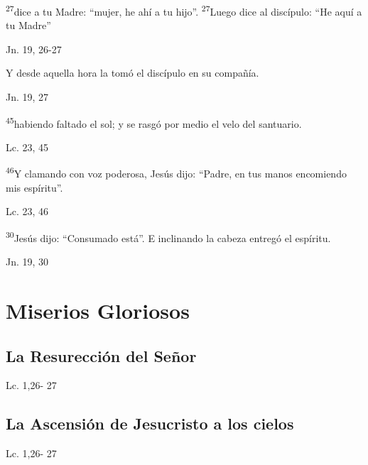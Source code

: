 \documentclass[a4paper,11pt]{article}
\begin{document}
      \textsuperscript{27}dice a tu Madre: ``mujer, he ahí a tu hijo''. \textsuperscript{27}Luego dice al discípulo: ``He aquí a tu Madre''
      \begin{flushright}
        Jn. 19, 26-27
      \end{flushright}

      Y desde aquella hora la tomó el discípulo en su compañía.
      \begin{flushright}
        Jn. 19, 27
      \end{flushright}

      \textsuperscript{45}habiendo faltado el sol; y se rasgó por medio el velo del santuario.
      \begin{flushright}
        Lc. 23, 45
      \end{flushright}

      \textsuperscript{46}Y clamando con voz poderosa, Jesús dijo: ``Padre, en tus manos encomiendo mis espíritu''.
      \begin{flushright}
        Lc. 23, 46 
      \end{flushright}

      \textsuperscript{30}Jesús dijo: ``Consumado está''. E inclinando la cabeza entregó el espíritu.
      \begin{flushright}
        Jn. 19, 30
      \end{flushright}
 
    \newpage
         
  \section*{\hfil Miserios Gloriosos \hfil}
    \subsection*{\hfil La Resurección del Señor \hfil}
      \begin{multicols}{2}

      \columnbreak
                           
      \end{multicols}
      \begin{flushright}
        Lc. 1,26- 27           
      \end{flushright}
    \subsection*{\hfil La Ascensión de Jesucristo a los cielos \hfil}
      \begin{multicols}{2}

      \columnbreak
                           
      \end{multicols}         
      \begin{flushright}
        Lc. 1,26- 27           
      \end{flushright}
\end{document}
